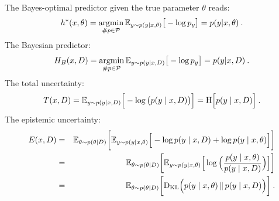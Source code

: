 The Bayes-optimal predictor given the true parameter $\theta$ reads:
\[
   h^*(x,\theta) = \mathop{\rm argmin}_{\#p\in{\cal P}} {\mathbb{E}}_{y\sim p(y|x,\theta)} \big [-\log p_y \big ] = p(y|x,\theta) \:.
\]
%
The Bayesian predictor:
\[
   H_B(x,D) =\mathop{\rm argmin}_{\#p\in{\cal P}} {\mathbb{E}}_{y\sim p(y|x,D)} \big [-\log p_y \big ] = p(y|x,D)\:.
\]
%
The total uncertainty:
\[
  T(x,D) = {\mathbb{E}}_{y\sim p(y\mid x,D)}\Big [-\log \big (p(y\mid x,D)\big) \Big] = {\rm H}\Big [ p(y\mid x,D)\Big ]\:.
\]
%
The epistemic uncertainty:
\begin{eqnarray*}
  E(x,D) & = & {\mathbb{E}}_{\theta \sim p(\theta|D)} \bigg [{\mathbb{E}}_{y\sim p(y | x,\theta)} 
    \Big [
       -\log p(y\mid x,D) + \log p(y\mid x,\theta )
    \Big ]
  \bigg ]\\
  & = & {\mathbb{E}}_{\theta \sim p(\theta|D)} \bigg [{\mathbb{E}}_{y\sim p(y | x,\theta)} 
    \Big [ \log \Big ( \frac{p(y\mid x,\theta )}{p(y\mid x,D)} \Big )
    \Big ] \bigg ]\\
    & =& {\mathbb{E}}_{\theta \sim p(\theta|D)} \bigg [
    {\rm D}_{\rm KL}\Big (p(y\mid x,\theta ) \,\|\,p(y\mid x,D) \Big )
    \bigg ]\:.
\end{eqnarray*}
